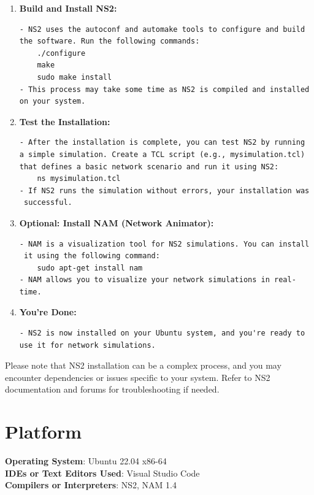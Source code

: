 \documentclass[11pt]{article}
\begin{document}
\begin{enumerate}
    \item \textbf{Build and Install NS2:}
          \begin{verbatim}
- NS2 uses the autoconf and automake tools to configure and build 
the software. Run the following commands:
    ./configure
    make
    sudo make install
- This process may take some time as NS2 is compiled and installed 
on your system.
       \end{verbatim}

    \item \textbf{Test the Installation:}
          \begin{verbatim}
- After the installation is complete, you can test NS2 by running 
a simple simulation. Create a TCL script (e.g., mysimulation.tcl) 
that defines a basic network scenario and run it using NS2:
    ns mysimulation.tcl
- If NS2 runs the simulation without errors, your installation was
 successful.
       \end{verbatim}

    \item \textbf{Optional: Install NAM (Network Animator):}
          \begin{verbatim}
- NAM is a visualization tool for NS2 simulations. You can install
 it using the following command:
    sudo apt-get install nam
- NAM allows you to visualize your network simulations in real-time.
       \end{verbatim}

    \item \textbf{You're Done:}
          \begin{verbatim}
- NS2 is now installed on your Ubuntu system, and you're ready to 
use it for network simulations.
       \end{verbatim}

\end{enumerate}

Please note that NS2 installation can be a complex process, and you may encounter dependencies or issues specific to your system. Refer to NS2 documentation and forums for troubleshooting if needed.


\section{Platform}
\textbf{Operating System}: Ubuntu 22.04 x86-64 \\
\textbf{IDEs or Text Editors Used}: Visual Studio Code\\
\textbf{Compilers or Interpreters}: NS2, NAM 1.4\\
\end{document}
